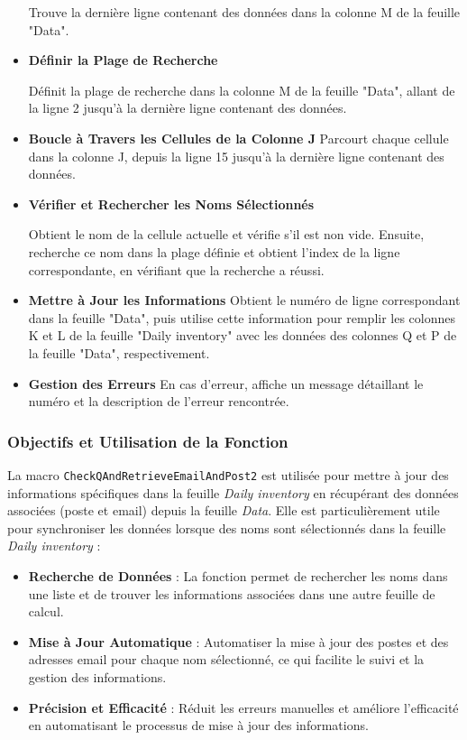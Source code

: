 \documentclass[a4paper, oneside, 12pt, final]{extreport}
\begin{document}
\begin{itemize}
Trouve la dernière ligne contenant des données dans la colonne M de la feuille "Data".
\item\textbf{Définir la Plage de Recherche}

Définit la plage de recherche dans la colonne M de la feuille "Data", allant de la ligne 2 jusqu'à la dernière ligne contenant des données.


\item\textbf{Boucle à Travers les Cellules de la Colonne J}
Parcourt chaque cellule dans la colonne J, depuis la ligne 15 jusqu'à la dernière ligne contenant des données.

\item\textbf{Vérifier et Rechercher les Noms Sélectionnés}

Obtient le nom de la cellule actuelle et vérifie s'il est non vide. Ensuite, recherche ce nom dans la plage définie et obtient l'index de la ligne correspondante, en vérifiant que la recherche a réussi.

\item\textbf{Mettre à Jour les Informations}
Obtient le numéro de ligne correspondant dans la feuille "Data", puis utilise cette information pour remplir les colonnes K et L de la feuille "Daily inventory" avec les données des colonnes Q et P de la feuille "Data", respectivement.

\item\textbf{Gestion des Erreurs}
En cas d'erreur, affiche un message détaillant le numéro et la description de l'erreur rencontrée.
\end{itemize}

\subsubsection{Objectifs et Utilisation de la Fonction}

La macro \texttt{CheckQAndRetrieveEmailAndPost2} est utilisée pour mettre à jour des informations spécifiques dans la feuille \textit{Daily inventory} en récupérant des données associées (poste et email) depuis la feuille \textit{Data}. Elle est particulièrement utile pour synchroniser les données lorsque des noms sont sélectionnés dans la feuille \textit{Daily inventory} :

\begin{itemize}
    \item \textbf{Recherche de Données} : La fonction permet de rechercher les noms dans une liste et de trouver les informations associées dans une autre feuille de calcul.
    \item \textbf{Mise à Jour Automatique} : Automatiser la mise à jour des postes et des adresses email pour chaque nom sélectionné, ce qui facilite le suivi et la gestion des informations.
    \item \textbf{Précision et Efficacité} : Réduit les erreurs manuelles et améliore l'efficacité en automatisant le processus de mise à jour des informations.
\end{itemize}
\end{document}
